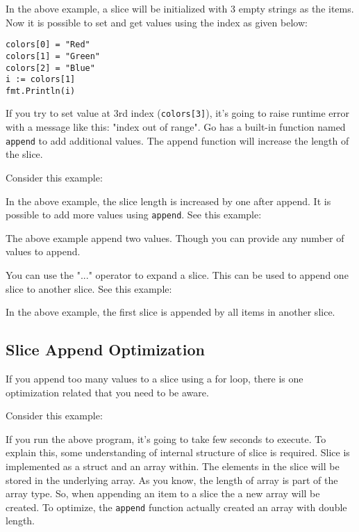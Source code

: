 In the above example, a slice will be initialized with 3 empty strings
as the items.  Now it is possible to set and get values using the
index as given below:

\begin{lstlisting}[numbers=none]
colors[0] = "Red"
colors[1] = "Green"
colors[2] = "Blue"
i := colors[1]
fmt.Println(i)
\end{lstlisting}

If you try to set value at 3rd index (\texttt{colors[3]}), it's going
to raise runtime error with a message like this: "index out of range".
Go has a built-in function named \texttt{append} to add additional
values.  The append function will increase the length of the slice.

Consider this example:



In the above example, the slice length is increased by one after
append.  It is possible to add more values using \texttt{append}.  See
this example:



The above example append two values.  Though you can provide any
number of values to append.

You can use the "..." operator to expand a slice.  This can be used to
append one slice to another slice.  See this example:



In the above example, the first slice is appended by all items in another slice.

\subsection{Slice Append Optimization}

If you append too many values to a slice using a
for loop, there is one optimization related that you need to be aware.

Consider this example:



If you run the above program, it's going to take few seconds to
execute.  To explain this, some understanding of internal structure of
slice is required.  Slice is implemented as a struct and an array
within.  The elements in the slice will be stored in the underlying
array.  As you know, the length of array is part of the array type.
So, when appending an item to a slice the a new array will be created.
To optimize, the \texttt{append} function actually created an array
with double length.

